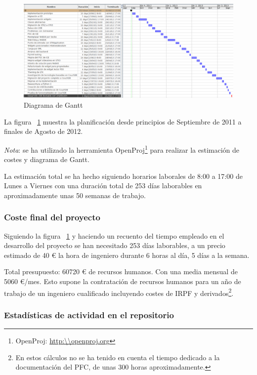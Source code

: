 \newpage

\begin{figure}[ht]
    \begin{center}
        \includegraphics[width=425px]{src/img/diagrams/gant-diagram.png}
        \caption[Diagrama de Gantt]
          {Diagrama de Gantt}
          \label{fig:gantdiagram}
    \end{center}
\end{figure}

La figura ~\ref{fig:gantdiagram} muestra la planificación desde principios de
Septiembre de 2011 a finales de Agosto de 2012. 

\emph{Nota}: se ha utilizado la herramienta OpenProj\footnote{OpenProj:
\url{http:\\openproj.org}} para realizar la estimación de costes y diagrama de
Gantt.

La estimación total se ha hecho siguiendo horarios laborales de 8:00 a 17:00 de
Lunes a Viernes con una duración total de 253 días laborables en aproximadamente
unas 50 semanas de trabajo.

\subsubsection{Coste final del proyecto}

Siguiendo la figura ~\ref{fig:gantdiagram} y haciendo un
recuento del tiempo empleado en el desarrollo del proyecto se han necesitado 
253 días laborables, a un precio estimado de 40 € la hora de
ingeniero durante 6 horas al día, 5 días a la semana.

Total presupuesto: 60720 € de recursos humanos. Con una media mensual de 5060
€/mes. Esto supone la contratación de recursos humanos para un año de trabajo
de un ingeniero cualificado incluyendo costes de IRPF y derivados\footnote{En estos cálculos no se ha tenido en cuenta el tiempo dedicado a la 
documentación del PFC, de unas 300 horas aproximadamente.}.

\subsubsection{Estadísticas de actividad en el repositorio}

